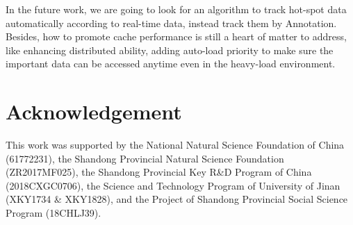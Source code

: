 \documentclass{singlecol-new}
\theoremstyle{TH}{
\newtheorem{lemma}{Lemma}
\newtheorem{theorem}[lemma]{Theorem}
\newtheorem{corrolary}[lemma]{Corrolary}
\newtheorem{conjecture}[lemma]{Conjecture}
\newtheorem{proposition}[lemma]{Proposition}
\newtheorem{claim}[lemma]{Claim}
\newtheorem{stheorem}[lemma]{Wrong Theorem}
}
\theoremstyle{THrm}{
\newtheorem{definition}{Definition}[section]
\newtheorem{question}{Question}[section]
\newtheorem{remark}{Remark}
\newtheorem{scheme}{Scheme}
}
\theoremstyle{THhit}{
\newtheorem{case}{Case}[section]
}
\begin{document}
In the future work, we are going to look for an algorithm to track hot-spot data automatically according to real-time data, instead track them by Annotation. Besides, how to promote cache performance is still a heart of matter to address, like enhancing distributed ability, adding auto-load priority to make sure the important data can be accessed anytime even in the heavy-load environment.


\section*{Acknowledgement}
This work was supported by the National Natural Science Foundation of China (61772231), the Shandong Provincial Natural Science Foundation (ZR2017MF025), the Shandong Provincial Key R\&D Program of China (2018CXGC0706), the Science and Technology Program of University of Jinan (XKY1734 \& XKY1828), and the Project of Shandong Provincial Social Science Program (18CHLJ39).



%
%
%



\end{document}
